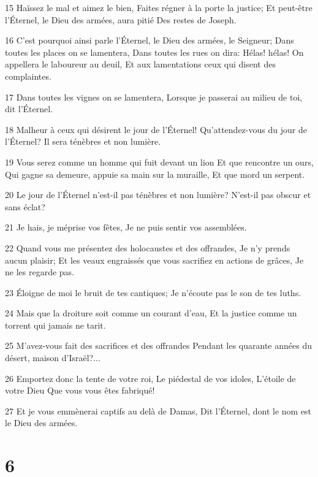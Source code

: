 \par 15 Haïssez le mal et aimez le bien, Faites régner à la porte la justice; Et peut-être l'Éternel, le Dieu des armées, aura pitié Des restes de Joseph.
\par 16 C'est pourquoi ainsi parle l'Éternel, le Dieu des armées, le Seigneur; Dans toutes les places on se lamentera, Dans toutes les rues on dira: Hélas! hélas! On appellera le laboureur au deuil, Et aux lamentations ceux qui disent des complaintes.
\par 17 Dans toutes les vignes on se lamentera, Lorsque je passerai au milieu de toi, dit l'Éternel.
\par 18 Malheur à ceux qui désirent le jour de l'Éternel! Qu'attendez-vous du jour de l'Éternel? Il sera ténèbres et non lumière.
\par 19 Vous serez comme un homme qui fuit devant un lion Et que rencontre un ours, Qui gagne sa demeure, appuie sa main sur la muraille, Et que mord un serpent.
\par 20 Le jour de l'Éternel n'est-il pas ténèbres et non lumière? N'est-il pas obscur et sans éclat?
\par 21 Je hais, je méprise vos fêtes, Je ne puis sentir vos assemblées.
\par 22 Quand vous me présentez des holocaustes et des offrandes, Je n'y prends aucun plaisir; Et les veaux engraissés que vous sacrifiez en actions de grâces, Je ne les regarde pas.
\par 23 Éloigne de moi le bruit de tes cantiques; Je n'écoute pas le son de tes luths.
\par 24 Mais que la droiture soit comme un courant d'eau, Et la justice comme un torrent qui jamais ne tarit.
\par 25 M'avez-vous fait des sacrifices et des offrandes Pendant les quarante années du désert, maison d'Israël?...
\par 26 Emportez donc la tente de votre roi, Le piédestal de vos idoles, L'étoile de votre Dieu Que vous vous êtes fabriqué!
\par 27 Et je vous emmènerai captifs au delà de Damas, Dit l'Éternel, dont le nom est le Dieu des armées.

\chapter{6}

